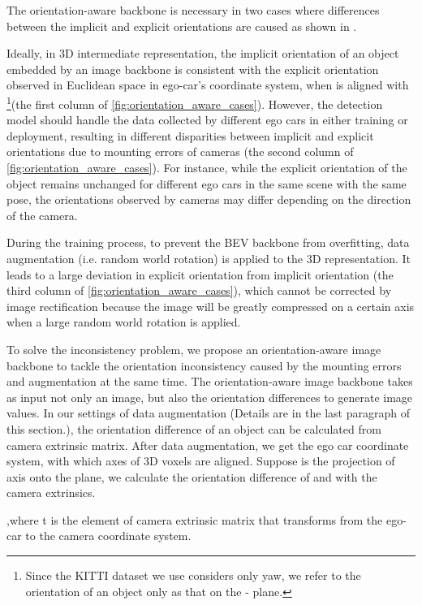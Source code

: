 \documentclass[10pt,twocolumn,letterpaper]{article}
\begin{document}
The orientation-aware backbone is necessary in two cases where differences between the implicit and explicit orientations are caused as shown in . 

 Ideally, in 3D intermediate representation, the implicit orientation of an object embedded by an image backbone is consistent with the explicit orientation observed in Euclidean space in ego-car's coordinate system, when  is aligned with  \footnote{Since the KITTI dataset we use considers only yaw, we refer to the orientation of an object only as that on the - plane.}(the first column of \cref{fig:orientation_aware_cases}). However, the detection model should handle the data collected by different ego cars in either training or deployment, resulting in different disparities between implicit and explicit orientations due to mounting errors of cameras (the second column of \cref{fig:orientation_aware_cases}). For instance, while the explicit orientation of the object remains unchanged for different ego cars in the same scene with the same pose, the orientations observed by cameras may differ depending on the direction of the camera. 

 During the training process, to prevent the BEV backbone from overfitting, data augmentation (i.e. random world rotation) is applied to the 3D representation. It leads to a large deviation in explicit orientation from implicit orientation (the third column of \cref{fig:orientation_aware_cases}), which cannot be corrected by image rectification because the image will be greatly compressed on a certain axis when a large random world rotation is applied.

To solve the inconsistency problem, we propose an orientation-aware image backbone to tackle the orientation inconsistency caused by the mounting errors and augmentation at the same time. The orientation-aware image backbone takes as input not only an image, but also the orientation differences to generate image values. In our settings of data augmentation (Details are in the last paragraph of this section.), the orientation difference of an object can be calculated from camera extrinsic matrix. After data augmentation, we get the ego car coordinate system, with which axes of 3D voxels are aligned. Suppose  is the projection of  axis onto the  plane, we calculate the orientation difference  of  and  with the camera extrinsics. 


,where t is the element of camera extrinsic matrix  that transforms from the ego-car to the camera coordinate system.
\end{document}
